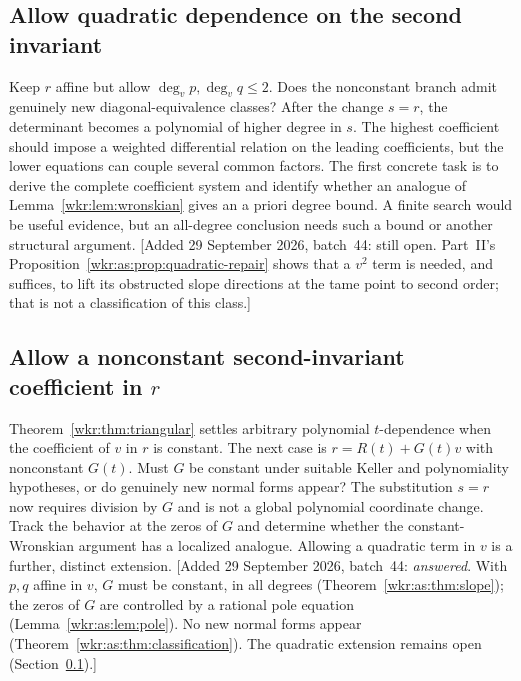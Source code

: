 \documentclass[11pt,a4paper]{article}
\numberwithin{equation}{section}
\theoremstyle{definition}
\theoremstyle{remark}
\begin{document}
\subsection{Allow quadratic dependence on the second invariant}
\label{wkr:as:q:quadratic}%

Keep $r$ affine but allow $\deg_vp,\deg_vq\le2$. Does the nonconstant
branch admit genuinely new diagonal-equivalence classes? After the change
$s=r$, the determinant becomes a polynomial of higher degree in $s$.
The highest coefficient should impose a weighted differential relation on
the leading coefficients, but the lower equations can couple several
common factors. The first concrete task is to derive the complete
coefficient system and identify whether an analogue of
Lemma~\ref{wkr:lem:wronskian} gives an a priori degree bound. A finite search
would be useful evidence, but an all-degree conclusion needs such a bound
or another structural argument.
[Added 29 September 2026, batch~44: still open. Part~II's
Proposition~\ref{wkr:as:prop:quadratic-repair} shows that a $v^2$ term is
needed, and suffices, to lift its obstructed slope directions at the tame
point to second order; that is not a classification of this class.]

\subsection{\texorpdfstring{Allow a nonconstant second-invariant coefficient in $r$}{Allow a nonconstant second-invariant coefficient in r}}
\label{wkr:as:q:slope}%

Theorem~\ref{wkr:thm:triangular} settles arbitrary polynomial $t$-dependence
when the coefficient of $v$ in $r$ is constant. The next case is
$r=R(t)+G(t)v$ with nonconstant $G(t)$. Must $G$ be constant under suitable
Keller and polynomiality hypotheses, or do genuinely new normal forms
appear? The substitution $s=r$ now requires division by $G$ and is not a
global polynomial coordinate change. Track the behavior at the zeros of
$G$ and determine whether the constant-Wronskian argument has a localized
analogue. Allowing a quadratic term in $v$ is a further, distinct extension.
[Added 29 September 2026, batch~44: \emph{answered}. With $p,q$ affine in
$v$, $G$ must be constant, in all degrees
(Theorem~\ref{wkr:as:thm:slope}); the zeros of $G$ are controlled by a
rational pole equation (Lemma~\ref{wkr:as:lem:pole}). No new normal forms
appear (Theorem~\ref{wkr:as:thm:classification}). The quadratic extension
remains open (Section~\ref{wkr:as:q:quadratic}).]
\end{document}

